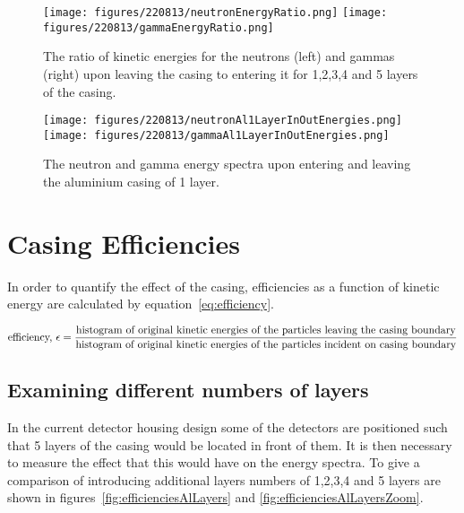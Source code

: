 \documentclass{article}
\begin{document}
\begin{figure}[htbp]
\begin{center}
\texttt{[image: figures/220813/neutronEnergyRatio.png]}
\texttt{[image: figures/220813/gammaEnergyRatio.png]}
\caption{The ratio of kinetic energies for the neutrons (left) and gammas (right) upon leaving the casing to entering it for 1,2,3,4 and 5 layers of the casing.}
\label{fig:energyRatio}
\end{center}
\end{figure}

\begin{figure}[htbp]
\begin{center}
\texttt{[image: figures/220813/neutronAl1LayerInOutEnergies.png]}
\texttt{[image: figures/220813/gammaAl1LayerInOutEnergies.png]}
\caption{The neutron and gamma energy spectra upon entering and leaving the aluminium casing of 1 layer.}
\label{fig:inOutFlux}
\end{center}
\end{figure}

\newpage

\section{Casing Efficiencies}
In order to quantify the effect of the casing, efficiencies as a function of kinetic energy are calculated by equation~\ref{eq:efficiency}.

\begin{equation}
\textnormal{efficiency, } \epsilon = \frac{\textnormal{histogram of original kinetic energies of the particles leaving the casing boundary}} {\textnormal{histogram of original kinetic energies of the particles incident on casing boundary}}
\label{eq:efficiency}
\end{equation}

\subsection{Examining different numbers of layers}
In the current detector housing design some of the detectors are positioned such that 5 layers of the casing would be located in front of them. It is then necessary to measure the effect that this would have on the energy spectra. To give a comparison of introducing additional layers numbers of 1,2,3,4 and 5 layers are shown in figures~\ref{fig:efficienciesAlLayers} and \ref{fig:efficienciesAlLayersZoom}.
\end{document}
